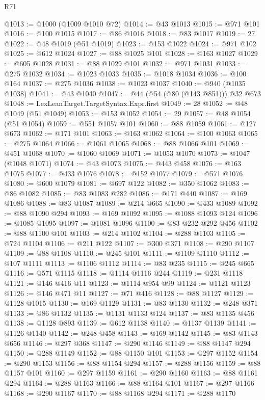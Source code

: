 \begin{lexlean}{R71}
\begin{coremodule}
@1013 := @1000 (@1009 @1010 @72)
@1014 := @43 @1013
@1015 := @971 @101
@1016 := @100 @1015
@1017 := @86 @1016
@1018 := @83 @1017
@1019 := 27
@1022 := @48 @1019 (@51 @1019)
@1023 := @153 @1022
@1024 := @971 @102
@1025 := @612 @1024
@1027 := @88 @1025 @101
@1028 := @163 @1027
@1029 := @605 @1028
@1031 := @88 @1029 @101
@1032 := @971 @1031
@1033 := @275 @1032
@1034 := @1023 @1033
@1035 := @1018 @1034
@1036 := @100 @164
@1037 := @275 @1036
@1038 := @1023 @1037
@1040 := @940 (@1035 @1038)
@1041 := @43 @1040
@1047 := @44 (@54 (@80 (@143 @851))) @32 @673
@1048 := LexLeanTarget.TargetSyntax.Expr.first
@1049 := 28
@1052 := @48 @1049 (@51 @1049)
@1053 := @153 @1052
@1054 := 29
@1057 := @48 @1054 (@51 @1054)
@1059 := @551 @1057 @101
@1060 := @88 @1059
@1061 := @127 @673
@1062 := @171 @101
@1063 := @163 @1062
@1064 := @100 @1063
@1065 := @275 @1064
@1066 := @1061 @1065
@1068 := @88 @1066 @101
@1069 := @451 @1068
@1070 := @1060 @1069
@1071 := @1053 @1070
@1073 := @1047 (@1048 @1071)
@1074 := @43 @1073
@1075 := @443 @458
@1076 := @163 @1075
@1077 := @433 @1076
@1078 := @152 @1077
@1079 := @571 @1076
@1080 := @600 @1079
@1081 := @697 @122
@1082 := @350 @1062
@1083 := @86 @1082
@1085 := @83 @1083 @282
@1086 := @171 @440
@1087 := @169 @1086
@1088 := @83 @1087
@1089 := @214 @665
@1090 := @433 @1089
@1092 := @88 @1090 @294
@1093 := @169 @1092
@1095 := @1088 @1093 @124
@1096 := @1085 @1095
@1097 := @1081 @1096
@1100 := @83 @232 @292 @456
@1102 := @88 @1100 @101
@1103 := @214 @1102
@1104 := @288 @1103
@1105 := @724 @1104
@1106 := @211 @122
@1107 := @300 @371
@1108 := @290 @1107
@1109 := @88 @1108
@1110 := @245 @101
@1111 := @1109 @1110
@1112 := @107 @1111
@1113 := @1106 @1112
@1114 := @83 @235
@1115 := @245 @665
@1116 := @571 @1115
@1118 := @1114 @1116 @244
@1119 := @231 @1118
@1121 := @146 @416 @11
@1123 := @1114 @954 @99
@1124 := @1121 @1123
@1126 := @146 @471 @11
@1127 := @71 @416
@1128 := @88 @1127
@1129 := @1128 @1015
@1130 := @169 @1129
@1131 := @83 @1130
@1132 := @248 @371
@1133 := @86 @1132
@1135 := @1131 @1133 @124
@1137 := @83 @1135 @456
@1138 := @1128 @893
@1139 := @612 @1138
@1140 := @1137 @1139
@1141 := @1126 @1140
@1142 := @248 @458
@1143 := @169 @1142
@1145 := @83 @1143 @656
@1146 := @297 @368
@1147 := @290 @1146
@1149 := @88 @1147 @294
@1150 := @288 @1149
@1152 := @88 @1150 @101
@1153 := @297 @1152
@1154 := @290 @1153
@1156 := @88 @1154 @294
@1157 := @288 @1156
@1159 := @88 @1157 @101
@1160 := @297 @1159
@1161 := @290 @1160
@1163 := @88 @1161 @294
@1164 := @288 @1163
@1166 := @88 @1164 @101
@1167 := @297 @1166
@1168 := @290 @1167
@1170 := @88 @1168 @294
@1171 := @288 @1170

\end{coremodule}
\end{lexlean}
